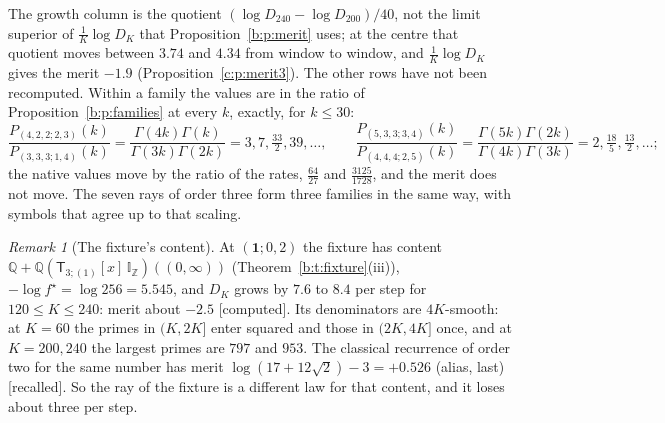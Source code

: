 \documentclass[11pt]{article}
\newcommand{\one}{\mathbf 1}
\newcommand{\sT}{\mathsf T}
\newcommand{\IZ}{\mathbb I_{\mathbb Z}}
\newcommand{\Tx}[3]{(\sT_{#1;(1)}[x]\,#2)((#3,\infty))}
\theoremstyle{plain}
\theoremstyle{definition}
\theoremstyle{remark}
\newtheorem{remark}[proposition]{Remark}
\newcommand{\computed}{\textup{[computed]}}
\newcommand{\recalled}{\textup{[recalled]}}
\begin{document}
The growth column is the quotient $(\log D_{240}-\log D_{200})/40$, not the limit superior of $\frac1K\log D_K$ that Proposition~\ref{b:p:merit} uses; at the centre that quotient moves between $3.74$ and $4.34$ from window to window, and $\frac1K\log D_K$ gives the merit $-1.9$ (Proposition~\ref{c:p:merit3}). The other rows have not been recomputed. Within a family the values are in the ratio of Proposition~\ref{b:p:families} at every $k$, exactly, for $k\le30$:
\[
\frac{P_{(4,2,2;2,3)}(k)}{P_{(3,3,3;1,4)}(k)}=\frac{\Gamma(4k)\Gamma(k)}{\Gamma(3k)\Gamma(2k)}=3,7,\tfrac{33}2,39,\dots,\qquad \frac{P_{(5,3,3;3,4)}(k)}{P_{(4,4,4;2,5)}(k)}=\frac{\Gamma(5k)\Gamma(2k)}{\Gamma(4k)\Gamma(3k)}=2,\tfrac{18}5,\tfrac{13}2,\dots;
\] the native values move by the ratio of the rates, $\frac{64}{27}$ and $\frac{3125}{1728}$, and the merit does not move. The seven rays of order three form three families in the same way, with symbols that agree up to that scaling.

\begin{remark}[The fixture's content]\label{b:r:fixmerit}
At $(\one;0,2)$ the fixture has content $\mathbb Q+\mathbb Q\Tx3{\IZ}0$ (Theorem~\ref{b:t:fixture}(iii)), $-\log f^\star=\log256=5.545$, and $D_K$ grows by $7.6$ to $8.4$ per step for $120\le K\le240$: merit about $-2.5$ \computed. Its denominators are $4K$-smooth: at $K=60$ the primes in $(K,2K]$ enter squared and those in $(2K,4K]$ once, and at $K=200,240$ the largest primes are $797$ and $953$. The classical recurrence of order two for the same number has merit $\log(17+12\sqrt2)-3=+0.526$ (alias, last) \recalled. So the ray of the fixture is a different law for that content, and it loses about three per step.
\end{remark}
\end{document}
